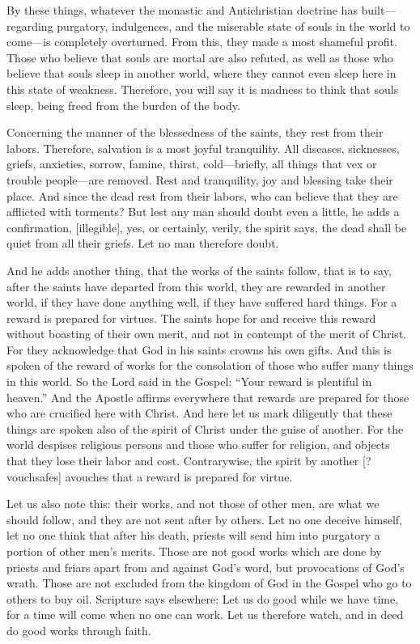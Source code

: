 By these things, whatever the monastic and Antichristian doctrine has built—regarding purgatory, indulgences, and the miserable state of souls in the world to come—is completely overturned. From this, they made a most shameful profit. Those who believe that souls are mortal are also refuted, as well as those who believe that souls sleep in another world, where they cannot even sleep here in this state of weakness. Therefore, you will say it is madness to think that souls sleep, being freed from the burden of the body.

Concerning the manner of the blessedness of the saints, they rest from their labors. Therefore, salvation is a most joyful tranquility. All diseases, sicknesses, griefs, anxieties, sorrow, famine, thirst, cold—briefly, all things that vex or trouble people—are removed. Rest and tranquility, joy and blessing take their place. And since the dead rest from their labors, who can believe that they are afflicted with torments? But lest any man should doubt even a little, he adds a confirmation, [illegible], yes, or certainly, verily, the spirit says, the dead shall be quiet from all their griefs. Let no man therefore doubt.

And he adds another thing, that the works of the saints follow, that is to say, after the saints have departed from this world, they are rewarded in another world, if they have done anything well, if they have suffered hard things. For a reward is prepared for virtues. The saints hope for and receive this reward without boasting of their own merit, and not in contempt of the merit of Christ. For they acknowledge that God in his saints crowns his own gifts. And this is spoken of the reward of works for the consolation of those who suffer many things in this world. So the Lord said in the Gospel: “Your reward is plentiful in heaven.” And the Apostle affirms everywhere that rewards are prepared for those who are crucified here with Christ. And here let us mark diligently that these things are spoken also of the spirit of Christ under the guise of another. For the world despises religious persons and those who suffer for religion, and objects that they lose their labor and cost. Contrarywise, the spirit by another [?vouchsafes] avouches that a reward is prepared for virtue.

Let us also note this: their works, and not those of other men, are what we should follow, and they are not sent after by others. Let no one deceive himself, let no one think that after his death, priests will send him into purgatory a portion of other men’s merits. Those are not good works which are done by priests and friars apart from and against God’s word, but provocations of God’s wrath. Those are not excluded from the kingdom of God in the Gospel who go to others to buy oil. Scripture says elsewhere: Let us do good while we have time, for a time will come when no one can work. Let us therefore watch, and in deed do good works through faith.
